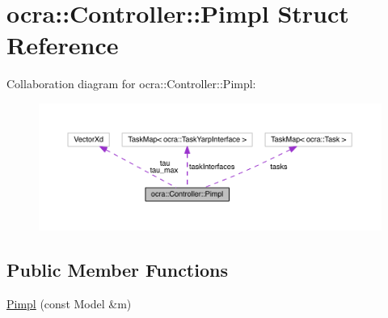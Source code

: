 \hypertarget{structocra_1_1Controller_1_1Pimpl}{}\section{ocra\+:\+:Controller\+:\+:Pimpl Struct Reference}
\label{structocra_1_1Controller_1_1Pimpl}


Collaboration diagram for ocra\+:\+:Controller\+:\+:Pimpl\+:\nopagebreak
\begin{figure}[H]
\begin{center}
\leavevmode
\includegraphics[width=350pt]{dc/d34/structocra_1_1Controller_1_1Pimpl__coll__graph}
\end{center}
\end{figure}
\subsection*{Public Member Functions}
\begin{DoxyCompactItemize}
\item 
\hyperlink{structocra_1_1Controller_1_1Pimpl_ad59ee786ca8b100a87e797cdfc6c15f5}{Pimpl} (const Model \&m)
\end{DoxyCompactItemize}
